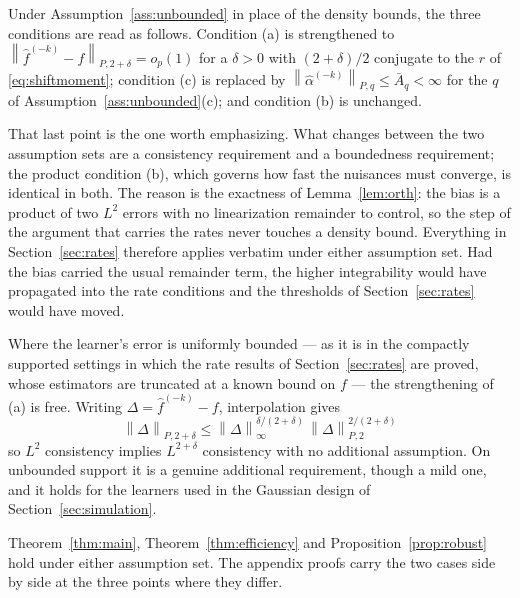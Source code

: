\documentclass[12pt]{article}
\newcommand{\norm}[1]{\left\| #1 \right\|}
\newcommand{\Ptwo}[1]{\norm{#1}_{P,2}}
\newcommand{\Pq}[2]{\norm{#1}_{P,#2}}
\begin{document}
	Under Assumption~\ref{ass:unbounded} in place of the density bounds, the three
	conditions are read as follows. Condition (a) is strengthened to
	$\Pq{\hat{f}^{(-k)} - f}{2 + \delta} = o_p(1)$ for a $\delta > 0$ with
	$(2 + \delta)/2$ conjugate to the $r$ of \eqref{eq:shiftmoment}; condition (c) is
	replaced by $\Pq{\hat{\alpha}^{(-k)}}{q} \leq \bar{A}_q < \infty$ for the $q$ of
	Assumption~\ref{ass:unbounded}(c); and condition (b) is unchanged.

	That last point is the one worth emphasizing. What changes between the two
	assumption sets are a consistency requirement and a boundedness requirement; the
	product condition (b), which governs how fast the nuisances must converge, is
	identical in both. The reason is the exactness of Lemma~\ref{lem:orth}: the bias
	is a product of two $L^2$ errors with no linearization remainder to control, so
	the step of the argument that carries the rates never touches a density bound.
	Everything in Section~\ref{sec:rates} therefore applies verbatim under either
	assumption set. Had the bias carried the usual remainder term, the higher
	integrability would have propagated into the rate conditions and the thresholds
	of Section~\ref{sec:rates} would have moved.

	Where the learner's error is uniformly bounded --- as it is in the compactly
	supported settings in which the rate results of Section~\ref{sec:rates} are
	proved, whose estimators are truncated at a known bound on $f$ --- the
	strengthening of (a) is free. Writing $\Delta = \hat{f}^{(-k)} - f$,
	interpolation gives
	\begin{equation}
		\Pq{\Delta}{2 + \delta}
		\leq \norm{\Delta}_\infty^{\delta/(2 + \delta)}\,
		\Ptwo{\Delta}^{2/(2 + \delta)}
		\label{eq:interp}
	\end{equation}
	so $L^2$ consistency implies $L^{2+\delta}$ consistency with no additional
	assumption. On unbounded support it is a genuine additional requirement, though a
	mild one, and it holds for the learners used in the Gaussian design of
	Section~\ref{sec:simulation}.

	Theorem~\ref{thm:main}, Theorem~\ref{thm:efficiency} and
	Proposition~\ref{prop:robust} hold under either assumption set. The appendix
	proofs carry the two cases side by side at the three points where they differ.
	
\end{document}
